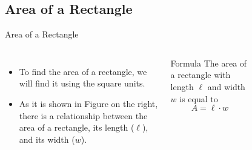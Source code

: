 \subsection{Area of a Rectangle}
\begin{frame}[t]{Area of a Rectangle}
    \begin{columns}[t]
    \begin{itemize}
        \item To find the area of a rectangle, we will find it using the square units. 
        \item As it is shown in Figure on the right, there is a relationship between the area of a rectangle, its length ($\ell$), and its width ($w$).
    \end{itemize}
    \begin{block}{Formula}
        The area of a rectangle with length $\ell$ and width $w$ is equal to
        \[ A = \ell\cdot w \]
    \end{block}
    \begin{figure}[H]
        \centering
        
    \end{figure}
    \end{columns}
\end{frame}
